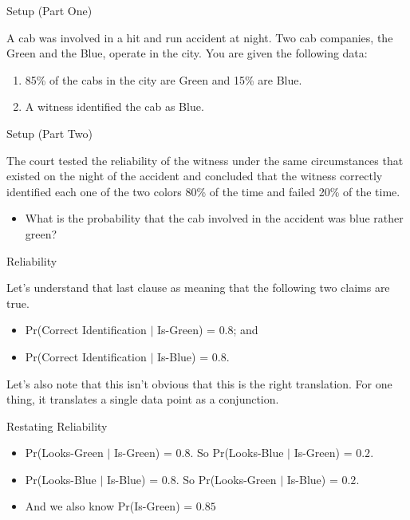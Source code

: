 \documentclass[
  ignorenonframetext,
]{beamer}
\providecommand{\tightlist}{%
  \setlength{\itemsep}{0pt}\setlength{\parskip}{0pt}}
\renewcommand{\,}{\text{, }}
\begin{document}
\begin{frame}{Setup (Part One)}
\protect\hypertarget{setup-part-one}{}

A cab was involved in a hit and run accident at night. Two cab
companies, the Green and the Blue, operate in the city. You are given
the following data:

\begin{enumerate}
\tightlist
\item
  85\% of the cabs in the city are Green and 15\% are Blue.
\item
  A witness identified the cab as Blue.
\end{enumerate}

\end{frame}

\begin{frame}{Setup (Part Two)}
\protect\hypertarget{setup-part-two}{}

The court tested the reliability of the witness under the same
circumstances that existed on the night of the accident and concluded
that the witness correctly identified each one of the two colors 80\% of
the time and failed 20\% of the time.

\begin{itemize}
\tightlist
\item
  What is the probability that the cab involved in the accident was blue
  rather green?
\end{itemize}

\end{frame}

\begin{frame}{Reliability}
\protect\hypertarget{reliability}{}

Let's understand that last clause as meaning that the following two
claims are true.

\begin{itemize}
\tightlist
\item
  Pr(Correct Identification \(|\) Is-Green) = \(0.8\); and
\item
  Pr(Correct Identification \(|\) Is-Blue) = \(0.8\).
\end{itemize}

Let's also note that this isn't obvious that this is the right
translation. For one thing, it translates a single data point as a
conjunction.

\end{frame}

\begin{frame}{Restating Reliability}
\protect\hypertarget{restating-reliability}{}

\begin{itemize}
\tightlist
\item
  Pr(Looks-Green \(|\) Is-Green) = \(0.8\). \pause So Pr(Looks-Blue
  \(|\) Is-Green) = \(0.2\). \pause
\item
  Pr(Looks-Blue \(|\) Is-Blue) = \(0.8\). \pause So Pr(Looks-Green \(|\)
  Is-Blue) = \(0.2\). \pause
\item
  And we also know Pr(Is-Green) = \(0.85\)
\end{itemize}

\end{frame}
\end{document}
